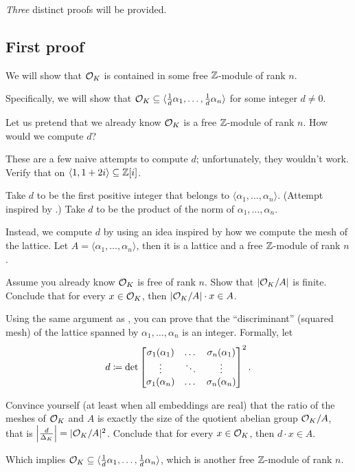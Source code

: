 \emph{Three} distinct proofs will be provided.

\subsection{First proof}

\begin{moral}
	We will show that $\mathcal O_K$ is contained in some free $\mathbb Z$-module of rank $n$.
\end{moral}

Specifically, we will show that $\mathcal O_K \subseteq \langle \frac{1}{d}\alpha_1, \dots,
\frac{1}{d}\alpha_n \rangle$ for some integer $d \neq 0$.

Let us pretend that we already know $\mathcal O_K$ is a free $\mathbb Z$-module of
rank $n$. How would we compute $d$?

\begin{exercise}
	These are a few naive attempts to compute $d$; unfortunately, they wouldn't work. Verify that
	on $\langle 1, 1+2i \rangle \subseteq \mathbb Z[i]$.
	\begin{itemize}
		\ii Take $d$ to be the first positive integer that belongs to
		$\langle \alpha_1, \dots, \alpha_n \rangle$.
		(Attempt inspired by .)
		\ii Take $d$ to be the product of the norm of $\alpha_1, \dots, \alpha_n$.
	\end{itemize}
\end{exercise}

Instead, we compute $d$ by using an idea inspired by how we compute the mesh of the lattice.
Let $A = \langle \alpha_1, \dots, \alpha_n \rangle$, then it is a lattice and a free $\mathbb Z$-module of
rank $n$.

\begin{exercise}
	Assume you already know $\mathcal O_K$ is free of rank $n$.
	Show that $|\mathcal O_K/A|$ is finite.
	Conclude that for every $x \in \mathcal O_K$, then $|\mathcal O_K/A|
	\cdot x \in A$.
\end{exercise}

Using the same argument as , you can prove that the ``discriminant''
(squared mesh) of the lattice spanned by $\alpha_1, \dots, \alpha_n$ is an integer.
Formally, let \[ d \coloneqq \det
	\begin{bmatrix}
		\sigma_1(\alpha_1) & \dots & \sigma_n(\alpha_1) \\
		\vdots & \ddots & \vdots \\
		\sigma_1(\alpha_n) & \dots & \sigma_n(\alpha_n) \\
	\end{bmatrix}^2.  \]
\begin{exercise}
	Convince yourself (at least when all embeddings are real) that
	the ratio of the meshes of $\mathcal O_K$ and $A$ is exactly
	the size of the quotient abelian group $\mathcal O_K/A$, that is
	$\left\lvert \frac{d}{\Delta_K} \right\rvert = |\mathcal O_K/A|^2$.
	Conclude that for every $x \in \mathcal O_K$, then
	$d \cdot x \in A$.
\end{exercise}
Which implies $\mathcal O_K \subseteq \langle \frac{1}{d} \alpha_1, \dots, \frac{1}{d} \alpha_n \rangle$,
which is another free $\mathbb Z$-module of rank $n$.

